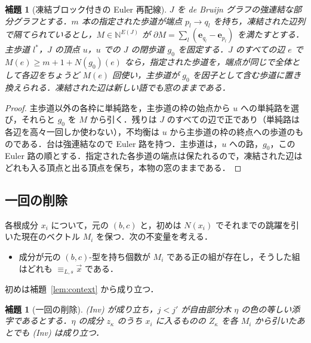 \documentclass[11pt,a4paper]{ltjsarticle}
\numberwithin{equation}{section}
\theoremstyle{plain}
\newtheorem{lemma}[theorem]{補題}
\theoremstyle{definition}
\theoremstyle{remark}
\theoremstyle{plain}
\newcommand{\tuple}[1]{\vec{#1}}
\begin{document}
\begin{lemma}[凍結ブロック付きの Euler 再配線]
\label{lem:euler}
$J$ を de Bruijn グラフの強連結な部分グラフとする．$m$ 本の指定された歩道が端点 $p_l\to q_l$ を持ち，凍結された辺列で隔てられているとし，$M\in\mathbb N^{E(J)}$ が $\partial M=\sum_l(\mathbf e_{q_l}-\mathbf e_{p_l})$ を満たすとする．主歩道 $l^*$，$J$ の頂点 $u$，$u$ での $J$ の閉歩道 $g_0$ を固定する．$J$ のすべての辺 $e$ で $M(e)\ge m+1+N(g_0)(e)$ なら，指定された歩道を，端点が同じで全体として各辺をちょうど $M(e)$ 回使い，主歩道が $g_0$ を因子として含む歩道に置き換えられる．凍結された辺は新しい語でも窓のままである．
\end{lemma}

\begin{proof}
主歩道以外の各枠に単純路を，主歩道の枠の始点から $u$ への単純路を選び，それらと $g_0$ を $M$ から引く．残りは $J$ のすべての辺で正であり（単純路は各辺を高々一回しか使わない），不均衡は $u$ から主歩道の枠の終点への歩道のものである．台は強連結なので Euler 路を持つ．主歩道は，$u$ への路，$g_0$，この Euler 路の順とする．指定された各歩道の端点は保たれるので，凍結された辺はどれも入る頂点と出る頂点を保ち，本物の窓のままである．
\end{proof}

\subsection{一回の削除}

各根成分 $x_i$ について，元の $(b,c)$ と，初めは $N(x_i)$ でそれまでの跳躍を引いた現在のベクトル $M_i$ を保つ．次の不変量を考える．
\begin{itemize}[leftmargin=*]
\item[(Inv)] 成分が元の $(b,c)$-型を持ち個数が $M_i$ である正の組が存在し，そうした組はどれも $\equiv_{L,s}\tuple x$ である．
\end{itemize}
初めは補題~\ref{lem:context} から成り立つ．

\begin{lemma}[一回の削除]
\label{lem:deletion}
(Inv) が成り立ち，$j<j'$ が自由部分木 $\eta$ の色の等しい添字であるとする．$\eta$ の成分 $z_\kappa$ のうち $x_i$ に入るものの $Z_\kappa$ を各 $M_i$ から引いたあとでも (Inv) は成り立つ．
\end{lemma}
\end{document}
